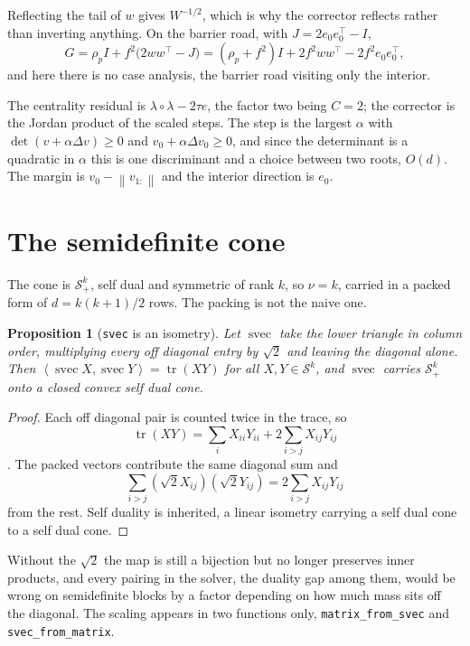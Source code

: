 \documentclass[a4paper,11pt]{book}
\theoremstyle{plain}
\newtheorem{proposition}[theorem]{Proposition}
\theoremstyle{definition}
\theoremstyle{remark}
\numberwithin{equation}{chapter}
\numberwithin{algorithm}{chapter}
\newcommand{\Sp}{\mathcal{S}}
\newcommand{\norm}[1]{\left\|#1\right\|}
\newcommand{\inner}[2]{\left\langle #1, #2 \right\rangle}
\newcommand{\tr}{\operatorname{tr}}
\newcommand{\svec}{\operatorname{svec}}
\begin{document}
	Reflecting the tail of $w$ gives $W^{-1/2}$, which is why the corrector
	reflects rather than inverting anything. On the barrier road, with
	$J=2e_0e_0^{\top}-I$,
	\[
	G=\rho_pI+f^2\bigl(2ww^{\top}-J\bigr)
	=(\rho_p+f^2)I+2f^2ww^{\top}-2f^2e_0e_0^{\top} ,
	\]
	and here there is no case analysis, the barrier road visiting only the
	interior.

	The centrality residual is $\lambda\circ\lambda-2\tau e$, the factor two being
	$C=2$; the corrector is the Jordan product of the scaled steps. The step is
	the largest $\alpha$ with $\det(v+\alpha\Delta v)\geq0$ and
	$v_0+\alpha\Delta v_0\geq0$, and since the determinant is a quadratic in
	$\alpha$ this is one discriminant and a choice between two roots, $O(d)$. The
	margin is $v_0-\norm{v_{1:}}$ and the interior direction is $e_0$.

	\section{The semidefinite cone}

	The cone is $\Sp^k_+$, self dual and symmetric of rank $k$, so $\nu=k$,
	carried in a packed form of $d=k(k+1)/2$ rows. The packing is not the naive
	one.

	\begin{proposition}[\texttt{svec} is an isometry]\label{prop:svec}
		Let $\svec$ take the lower triangle in column order, multiplying every off
		diagonal entry by $\sqrt2$ and leaving the diagonal alone. Then
		$\inner{\svec X}{\svec Y}=\tr(XY)$ for all $X,Y\in\Sp^k$, and $\svec$
		carries $\Sp^k_+$ onto a closed convex self dual cone.
	\end{proposition}

	\begin{proof}
		Each off diagonal pair is counted twice in the trace, so
		$$\tr(XY)=\sum_iX_{ii}Y_{ii}+2\sum_{i>j}X_{ij}Y_{ij}$$. The packed vectors
		contribute the same diagonal sum and
		$$\sum_{i>j}(\sqrt2X_{ij})(\sqrt2Y_{ij})=2\sum_{i>j}X_{ij}Y_{ij}$$ from the
		rest. Self duality is inherited, a linear isometry carrying a self dual cone
		to a self dual cone.
	\end{proof}

	Without the $\sqrt2$ the map is still a bijection but no longer preserves
	inner products, and every pairing in the solver, the duality gap among them,
	would be wrong on semidefinite blocks by a factor depending on how much mass
	sits off the diagonal. The scaling appears in two functions only,
	\texttt{matrix\_from\_svec} and \texttt{svec\_from\_matrix}.
\end{document}
